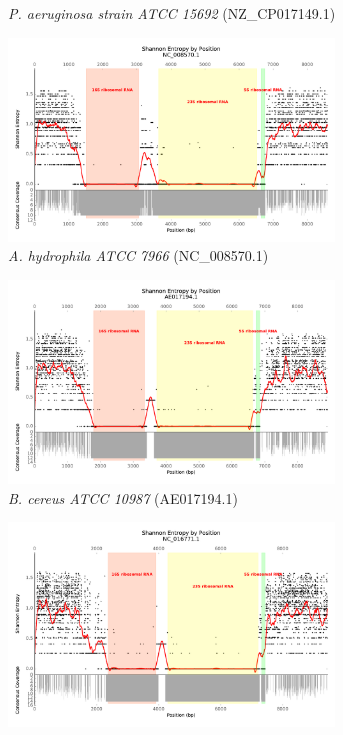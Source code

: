 \documentclass[10pt]{article}
\begin{document}
\begin{figure}[h]
\begin{subfigure}[b]{.45\textwidth}
    \caption{\textit{P. aeruginosa strain ATCC 15692} (NZ\_CP017149.1)}
    \label{fig:ent_pao}
  \end{subfigure}
  \begin{subfigure}[b]{.45\textwidth}
    \includegraphics[width=0.95\textwidth]{gage_entropy_figures/NC_008570.1_entropy_plot}
    \caption{\textit{A. hydrophila ATCC 7966} (NC\_008570.1)}
    \label{fig:ent_aero}
  \end{subfigure}
  \begin{subfigure}[b]{.45\textwidth}
    \includegraphics[width=0.95\textwidth]{gage_entropy_figures/AE017194.1_entropy_plot}
    \caption{\textit{B. cereus ATCC 10987} (AE017194.1)}
    \label{fig:ent_cereus_atcc}
  \end{subfigure}
  \begin{subfigure}[b]{.45\textwidth}
    \includegraphics[width=0.95\textwidth]{gage_entropy_figures/NC_016771.1_entropy_plot}

\end{subfigure}
\end{figure}
\end{document}
